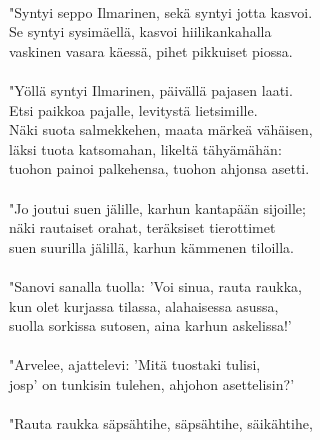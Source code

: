                                                                        \\
"Syntyi seppo Ilmarinen, sekä syntyi jotta kasvoi.                     \\
Se syntyi sysimäellä, kasvoi hiilikankahalla                           \\
vaskinen vasara käessä, pihet pikkuiset piossa.                        \\
                                                                       \\
"Yöllä syntyi Ilmarinen, päivällä pajasen laati.                       \\
Etsi paikkoa pajalle, levitystä lietsimille.                           \\
Näki suota salmekkehen, maata märkeä vähäisen,                         \\
läksi tuota katsomahan, likeltä tähyämähän:                            \\
tuohon painoi palkehensa, tuohon ahjonsa asetti.                       \\
                                                                       \\
"Jo joutui suen jälille, karhun kantapään sijoille;                    \\
näki rautaiset orahat, teräksiset tierottimet                          \\
suen suurilla jälillä, karhun kämmenen tiloilla.                       \\
                                                                       \\
"Sanovi sanalla tuolla: 'Voi sinua, rauta raukka,                      \\
kun olet kurjassa tilassa, alahaisessa asussa,                         \\
suolla sorkissa sutosen, aina karhun askelissa!'                       \\
                                                                       \\
"Arvelee, ajattelevi: 'Mitä tuostaki tulisi,                           \\
josp' on tunkisin tulehen, ahjohon asettelisin?'                       \\
                                                                       \\
"Rauta raukka säpsähtihe, säpsähtihe, säikähtihe,                      \\
